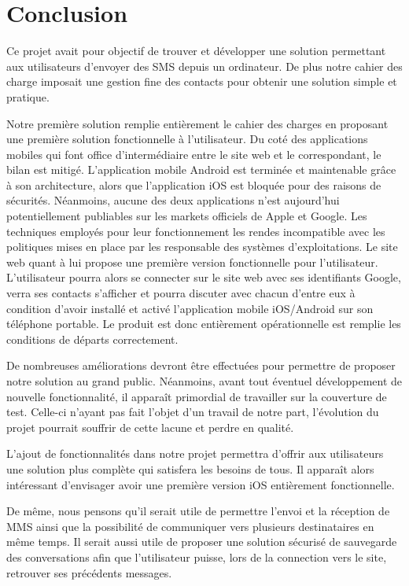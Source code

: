 \cleardoublepage

\chapter*{Conclusion}


Ce projet avait pour objectif de trouver et développer une solution permettant aux utilisateurs d'envoyer des SMS depuis un ordinateur.
De plus notre cahier des charge imposait une gestion fine des contacts pour obtenir une solution simple et pratique.

Notre première solution remplie entièrement le cahier des charges en proposant une première solution fonctionnelle à l'utilisateur. 
Du coté des applications mobiles qui font office d'intermédiaire entre le site web et le correspondant, le bilan est mitigé. L'application mobile Android est terminée et maintenable grâce à son architecture, alors que l'application iOS est bloquée pour des raisons de sécurités.
Néanmoins, aucune des deux applications n'est aujourd'hui potentiellement publiables sur les markets officiels de Apple et Google. Les techniques employés pour leur fonctionnement les rendes incompatible avec les politiques mises en place par les responsable des systèmes d'exploitations.
Le site web quant à lui propose une première version fonctionnelle pour l'utilisateur. L'utilisateur pourra alors se connecter sur le site web avec
ses identifiants Google, verra ses contacts s'afficher et pourra discuter avec chacun d'entre eux à condition d'avoir installé et activé l'application
mobile iOS/Android sur son téléphone portable.
Le produit est donc entièrement opérationnelle est remplie les conditions de départs correctement.

De nombreuses améliorations devront être effectuées pour permettre de proposer notre solution au grand public.
Néanmoins, avant tout éventuel développement de nouvelle fonctionnalité, il apparaît primordial de travailler sur la couverture de test. Celle-ci 
n'ayant pas fait l'objet d'un travail de notre part, l'évolution du projet pourrait souffrir de cette lacune et perdre en qualité.

L'ajout de fonctionnalités dans notre projet permettra d'offrir aux utilisateurs une solution plus complète qui satisfera les besoins de tous.
Il apparaît alors intéressant d'envisager avoir une première version iOS entièrement fonctionnelle.

De même, nous pensons qu'il serait utile de permettre l'envoi et la réception de MMS ainsi que la possibilité de communiquer vers plusieurs destinataires
en même temps. Il serait aussi utile de proposer une solution sécurisé de sauvegarde des conversations afin que l'utilisateur puisse, lors de la connection vers le site, retrouver ses précédents messages. 